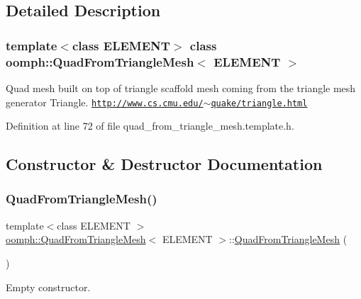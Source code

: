 \subsection{Detailed Description}
\subsubsection*{template$<$class E\+L\+E\+M\+E\+NT$>$\newline
class oomph\+::\+Quad\+From\+Triangle\+Mesh$<$ E\+L\+E\+M\+E\+N\+T $>$}

Quad mesh built on top of triangle scaffold mesh coming from the triangle mesh generator Triangle. \href{http://www.cs.cmu.edu/~quake/triangle.html}{\tt http\+://www.\+cs.\+cmu.\+edu/$\sim$quake/triangle.\+html} 

Definition at line 72 of file quad\+\_\+from\+\_\+triangle\+\_\+mesh.\+template.\+h.



\subsection{Constructor \& Destructor Documentation}
\mbox{\label{classoomph_1_1QuadFromTriangleMesh_af94e552be1bd35ec03eed1bcfcbc40af}} 
\subsubsection{\texorpdfstring{Quad\+From\+Triangle\+Mesh()}{QuadFromTriangleMesh()}\hspace{0.1cm}{\footnotesize\ttfamily [1/4]}}
{\footnotesize\ttfamily template$<$class E\+L\+E\+M\+E\+NT $>$ \\
\hyperlink{classoomph_1_1QuadFromTriangleMesh}{oomph\+::\+Quad\+From\+Triangle\+Mesh}$<$ E\+L\+E\+M\+E\+NT $>$\+::\hyperlink{classoomph_1_1QuadFromTriangleMesh}{Quad\+From\+Triangle\+Mesh} (\begin{DoxyParamCaption}{ }\end{DoxyParamCaption})\hspace{0.3cm}{\ttfamily [inline]}}



Empty constructor. 



